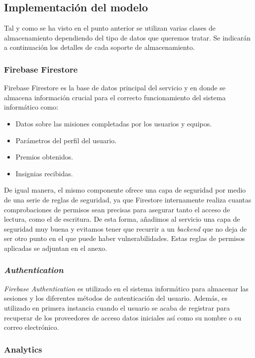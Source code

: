 \documentclass[twoside]{report}
\begin{document}
\subsection{Implementación del modelo}

Tal y como se ha visto en el punto anterior se utilizan varias clases de almacenamiento dependiendo del tipo de datos que queremos tratar. Se indicarán a continuación los detalles de cada soporte de almacenamiento.

\subsubsection{Firebase Firestore}

Firebase Firestore es la base de datos principal del servicio y en donde se almacena información crucial para el correcto funcionamiento del sistema informático como:
\begin{itemize}
\item Datos sobre las misiones completadas por los usuarios y equipos.
\item Parámetros del perfil del usuario.
\item Premios obtenidos.
\item Insignias recibidas.
\end{itemize} 

De igual manera, el mismo componente ofrece una capa de seguridad por medio de una serie de reglas de seguridad, ya que Firestore internamente realiza cuantas comprobaciones de permisos sean precisas para asegurar tanto el acceso de lectura, como el de escritura. De esta forma, añadimos al servicio una capa de seguridad muy buena y evitamos tener que recurrir a un \textit{backend} que no deja de ser otro punto en el que puede haber vulnerabilidades. Estas reglas de permisos aplicadas se adjuntan en el anexo.

\subsubsection{\textit{Authentication}}

\textit{Firebase Authentication} es utilizado en el sistema informático para almacenar las sesiones y los diferentes métodos de autenticación del usuario. Además, es utilizado en primera instancia cuando el usuario se acaba de registrar para recuperar de los proveedores de acceso datos iniciales así como su nombre o su correo electrónico.

\subsubsection{Analytics}
\end{document}
